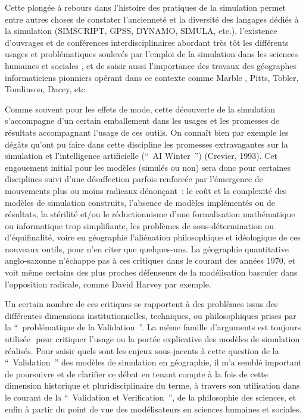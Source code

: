 Cette plongée à rebours dans l'histoire des pratiques de la simulation permet entre autres choses de constater l'ancienneté et la diversité des langages dédiés à la simulation (SIMSCRIPT, GPSS, DYNAMO, SIMULA, etc.), l'existence  d'ouvrages et de conférences interdisciplinaires abordant très tôt les différents usages et problématiques soulevés par l'emploi de la simulation dans les sciences humaines et sociales \autocites{Shubik1960b,Shubik1960a, Borko1962, Guetzkow1962, Beshers1965, Guetzkow1972, Shubik1972, Morgan2004, Dutton1971}⁠⁠, et de saisir aussi l'importance des travaux des géographes informaticiens pionniers opérant dans ce contexte comme Marble , Pitts, Tobler, Tomlinson, Dacey, etc. \autocites{Marble2010, Marble1972}

Comme souvent pour les effets de mode, cette découverte de la simulation  s'accompagne d'un certain emballement dans les usages et les promesses de résultats accompagnant l'usage de ces outils. On connaît bien par exemple les dégâts qu'ont pu faire dans cette discipline les promesses extravagantes sur la simulation et l'intelligence artificielle (\foreignquote{english}{ AI Winter }) (Crevier, 1993). Cet engouement initial pour les modèles (simulés ou  non) sera donc pour certaines disciplines suivi d'une désaffection parfois renforcée par l'émergence de mouvements plus ou moins radicaux dénonçant : le coût et la complexité des modèles de simulation construits, l'absence de modèles implémentés ou de résultats, la stérilité et/ou le réductionnisme d'une formalisation mathématique ou informatique trop simplifiante, les problèmes de sous-détermination ou d'équifinalité, voire en géographie l'aliénation philosophique et idéologique de ces nouveaux outils, pour n'en citer que quelques-uns. La géographie quantitative anglo-saxonne n'échappe pas à ces critiques dans le courant des années 1970, et voit même certains des plus proches défenseurs de la modélisation basculer dans l'opposition radicale, comme David Harvey par exemple.

Un certain nombre de ces critiques se rapportent à des problèmes issus des différentes dimensions institutionnelles, techniques, ou philosophiques prises par la \enquote{ problématique de la Validation }. La même famille d'arguments est toujours utilisée \autocites{Amblard2006, Waldherr2013}⁠ pour critiquer l'usage ou la portée explicative des modèles de simulation réalisés. Pour saisir quels sont les enjeux sous-jacents à cette question de la \enquote{ Validation } des modèles de simulation en géographie, il m'a semblé important de poursuivre et de clarifier ce débat en tenant compte à la fois de cette dimension historique et pluridisciplinaire du terme, à travers son utilisation dans le courant de la \enquote{ Validation et Verification }, de la philosophie des sciences, et enfin à partir du point de vue des modélisateurs en sciences humaines et sociales. 

